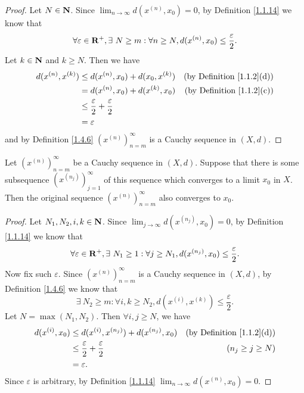 \begin{proof}
    Let \(N \in \mathbf{N}\).
    Since \(\lim_{n \to \infty} d(x^{(n)}, x_0) = 0\), by Definition \ref{1.1.14} we know that
    \[
        \forall \varepsilon \in \mathbf{R}^+, \exists\ N \geq m : \forall n \geq N, d(x^{(n)}, x_0) \leq \frac{\varepsilon}{2}.
    \]
    Let \(k \in \mathbf{N}\) and \(k \geq N\).
    Then we have
    \begin{align*}
        d(x^{(n)}, x^{(k)}) & \leq d(x^{(n)}, x_0) + d(x_0, x^{(k)})             & \text{(by Definition \ref{1.1.2}(d))} \\
                            & = d(x^{(n)}, x_0) + d(x^{(k)}, x_0)                & \text{(by Definition \ref{1.1.2}(c))} \\
                            & \leq \frac{\varepsilon}{2} + \frac{\varepsilon}{2}                                         \\
                            & = \varepsilon
    \end{align*}
    and by Definition \ref{1.4.6} \((x^{(n)})_{n = m}^\infty\) is a Cauchy sequence in \((X, d)\).
\end{proof}

\setcounter{theorem}{8}
\begin{lemma}\label{1.4.9}
    Let \((x^{(n)})_{n = m}^\infty\) be a Cauchy sequence in \((X, d)\).
    Suppose that there is some subsequence \((x^{(n_j)})_{j = 1}^\infty\) of this sequence which converges to a limit \(x_0\) in \(X\).
    Then the original sequence \((x^{(n)})_{n = m}^\infty\) also converges to \(x_0\).
\end{lemma}

\begin{proof}
    Let \(N_1, N_2, i, k \in \mathbf{N}\).
    Since \(\lim_{j \to \infty} d(x^{(n_j)}, x_0) = 0\), by Definition \ref{1.1.14} we know that
    \[
        \forall \varepsilon \in \mathbf{R}^+, \exists\ N_1 \geq 1 : \forall j \geq N_1, d(x^{(n_j)}, x_0) \leq \frac{\varepsilon}{2}.
    \]
    Now fix such \(\varepsilon\).
    Since \((x^{(n)})_{n = m}^\infty\) is a Cauchy sequence in \((X, d)\), by Definition \ref{1.4.6} we know that
    \[
        \exists\ N_2 \geq m : \forall i, k \geq N_2, d(x^{(i)}, x^{(k)}) \leq \frac{\varepsilon}{2}.
    \]
    Let \(N = \max(N_1, N_2)\).
    Then \(\forall i, j \geq N\), we have
    \begin{align*}
        d(x^{(i)}, x_0) & \leq d(x^{(i)}, x^{(n_j)}) + d(x^{(n_j)}, x_0)     & \text{(by Definition \ref{1.1.2}(d))} \\
                        & \leq \frac{\varepsilon}{2} + \frac{\varepsilon}{2} & (n_j \geq j \geq N)                   \\
                        & = \varepsilon.
    \end{align*}
    Since \(\varepsilon\) is arbitrary, by Definition \ref{1.1.14} \(\lim_{n \to \infty} d(x^{(n)}, x_0) = 0\).
\end{proof}

